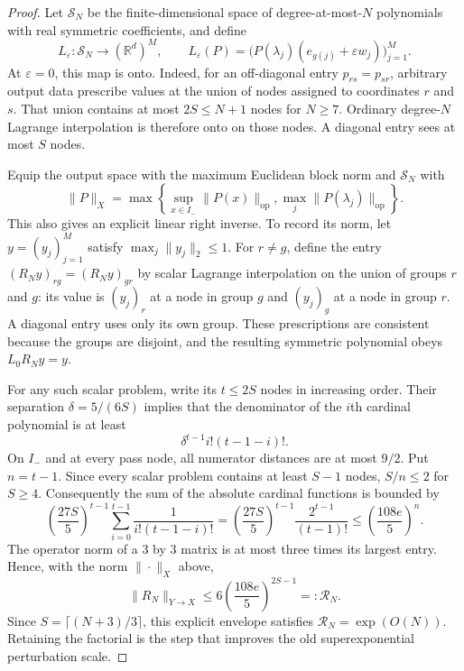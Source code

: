 \documentclass[11pt]{article}
\theoremstyle{remark}
\newcommand{\R}{\mathbb{R}}
\newcommand{\cS}{\mathcal{S}}
\newcommand{\op}{\mathrm{op}}
\begin{document}
\begin{proof}
Let $\cS_N$ be the finite-dimensional space of degree-at-most-$N$ polynomials
with real symmetric coefficients, and define
\[
 L_\varepsilon:\cS_N\longrightarrow(\R^d)^M,
 \qquad L_\varepsilon(P)
 =\bigl(P(\lambda_j)(e_{g(j)}+\varepsilon w_j)\bigr)_{j=1}^M.
\]
At $\varepsilon=0$, this map is onto.  Indeed, for an off-diagonal entry
$p_{rs}=p_{sr}$, arbitrary output data prescribe values at the union of nodes
assigned to coordinates $r$ and $s$.  That union contains at most
$2S\le N+1$ nodes for $N\ge7$.
Ordinary degree-$N$ Lagrange interpolation is therefore onto on those nodes.
A diagonal entry sees at most $S$ nodes.

Equip the output space with the maximum Euclidean block norm and $\cS_N$ with
\[
 \|P\|_X=\max\left\{\sup_{x\in I_-}\|P(x)\|_{\op},
                     \max_j\|P(\lambda_j)\|_{\op}\right\}.
\]
This also gives an explicit linear right inverse.  To record its norm, let
$y=(y_j)_{j=1}^M$ satisfy $\max_j\|y_j\|_2\le1$.  For $r\ne g$, define the
entry $(R_Ny)_{rg}=(R_Ny)_{gr}$ by scalar Lagrange interpolation on the union
of groups $r$ and $g$: its value is $(y_j)_r$ at a node in group $g$ and
$(y_j)_g$ at a node in group $r$.  A diagonal entry uses only its own group.
These prescriptions are consistent because the groups are disjoint, and the
resulting symmetric polynomial obeys $L_0R_Ny=y$.

For any such scalar problem, write its $t\le2S$ nodes in increasing order.
Their separation $\delta=5/(6S)$ implies that the denominator of the $i$th
cardinal polynomial is at least
\[
 \delta^{t-1}i!(t-1-i)!.
\]
On $I_-$ and at every pass node, all numerator distances are at most $9/2$.
Put $n=t-1$.  Since every scalar problem contains at least $S-1$ nodes,
$S/n\le2$ for $S\ge4$.  Consequently the sum of the absolute cardinal
functions is bounded by
\[
 \left(\frac{27S}{5}\right)^{t-1}
 \sum_{i=0}^{t-1}\frac1{i!(t-1-i)!}
 =\left(\frac{27S}{5}\right)^{t-1}
   \frac{2^{t-1}}{(t-1)!}
 \le\left(\frac{108e}{5}\right)^n.
\]
The operator norm of a $3$ by $3$ matrix is at most three times its largest
entry.  Hence, with the norm $\|\cdot\|_X$ above,
\begin{equation}\label{eq:rightinversebound}
 \|R_N\|_{Y\to X}
 \le6\left(\frac{108e}{5}\right)^{2S-1}
 =:\mathcal R_N.
\end{equation}
Since $S=\lceil(N+3)/3\rceil$, this explicit envelope satisfies
$\mathcal R_N=\exp(O(N))$.  Retaining the factorial is the step that improves
the old superexponential perturbation scale.


\end{proof}
\end{document}

